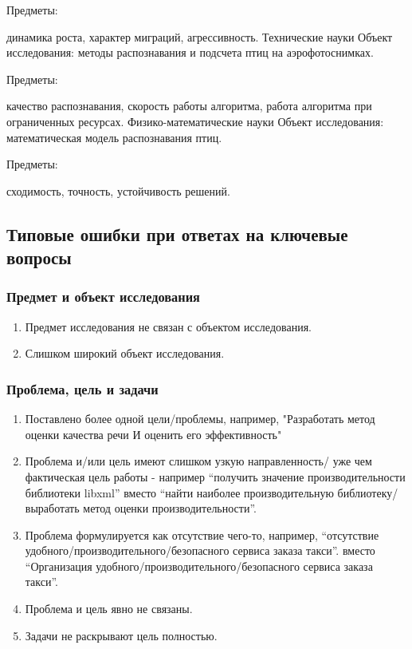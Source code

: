 \documentclass{report}
\begin{document}
Предметы:

динамика роста,
характер миграций,
агрессивность.
Технические науки
Объект исследования: методы распознавания и подсчета птиц на аэрофотоснимках.

Предметы:

качество распознавания,
скорость работы алгоритма,
работа алгоритма при ограниченных ресурсах.
Физико-математические науки
Объект исследования: математическая модель распознавания птиц.

Предметы:

сходимость,
точность,
устойчивость решений.

\subsection{Типовые ошибки при ответах на ключевые вопросы}

\subsubsection{Предмет и объект исследования}

\begin{enumerate}
	\item Предмет исследования не связан с объектом исследования.
	\item Слишком широкий объект исследования.
\end{enumerate}

\subsubsection{Проблема, цель и задачи}

\begin{enumerate}
	\item Поставлено более одной цели/проблемы, например, "Разработать метод оценки качества речи И оценить его эффективность"
	\item Проблема и/или цель имеют слишком узкую направленность/ уже чем фактическая цель работы - например “получить значение производительности библиотеки libxml” вместо “найти наиболее производительную библиотеку/ выработать метод оценки производительности”.
	\item Проблема формулируется как отсутствие чего-то, например, “отсутствие удобного/производительного/безопасного сервиса заказа такси”.  вместо “Организация удобного/производительного/безопасного сервиса заказа такси”.
	\item Проблема и цель явно не связаны.
	\item Задачи не раскрывают цель полностью.
\end{enumerate}
\end{document}
